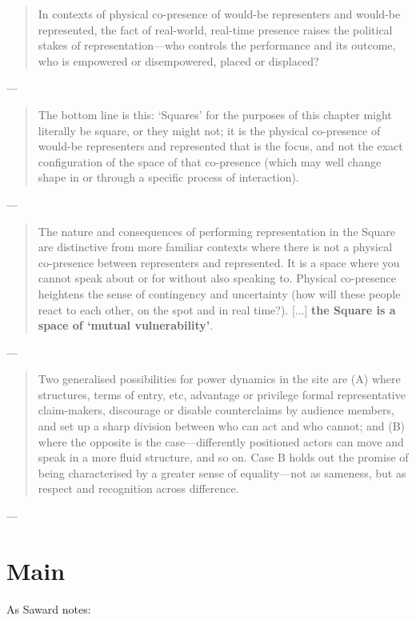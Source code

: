 \begin{quote}
	In contexts of physical co-presence of would-be representers and would-be represented, the fact of real-world, real-time presence raises the political stakes of representation—who controls the performance and its outcome, who is empowered or disempowered, placed or displaced?
\end{quote}
— \cite[3]{saward2024}

\begin{quote}
	The bottom line is this: ‘Squares’ for the purposes of this chapter might literally be square, or they might not; it is the physical co-presence of would-be representers and represented that is the focus, and not the exact configuration of the space of that co-presence (which may well change shape in or through a specific process of interaction).
\end{quote}
— \cite[5]{saward2024}

\begin{quote}
	The nature and consequences of performing representation in the Square are distinctive from more familiar contexts where there is not a physical co-presence between representers and represented. It is a space where you cannot speak about or for without also speaking to. Physical co-presence heightens the sense of contingency and uncertainty (how will these people react to each other, on the spot and in real time?). [...] \textbf{the Square is a space of ‘mutual vulnerability’}.
\end{quote}
— \cite[5]{saward2024}

\begin{quote}
	Two generalised possibilities for power dynamics in the site are (A) where structures, terms of entry, etc, advantage or privilege formal representative claim-makers, discourage or disable counterclaims by audience members, and set up a sharp division between who can act and who cannot; and (B) where the opposite is the case—differently positioned actors can move and speak in a more fluid structure, and so on. Case B holds out the promise of being characterised by a greater sense of equality—not as sameness, but as respect and recognition across difference.
\end{quote}
— \cite[13]{saward2024}

\chapter{Main}\label{chap:main}

As Saward notes:

